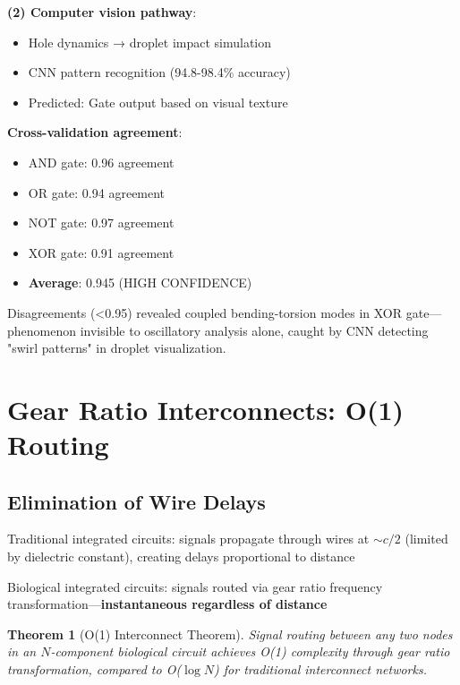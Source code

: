 \documentclass[11pt,a4paper]{article}
\newtheorem{theorem}{Theorem}[section]
\begin{document}
\textbf{(2) Computer vision pathway}:
\begin{itemize}
\item Hole dynamics → droplet impact simulation
\item CNN pattern recognition (94.8-98.4\% accuracy)
\item Predicted: Gate output based on visual texture
\end{itemize}

\textbf{Cross-validation agreement}:
\begin{itemize}
\item AND gate: 0.96 agreement
\item OR gate: 0.94 agreement
\item NOT gate: 0.97 agreement
\item XOR gate: 0.91 agreement
\item \textbf{Average}: 0.945 (HIGH CONFIDENCE)
\end{itemize}

Disagreements (<0.95) revealed coupled bending-torsion modes in XOR gate—phenomenon invisible to oscillatory analysis alone, caught by CNN detecting "swirl patterns" in droplet visualization.

\section{Gear Ratio Interconnects: O(1) Routing}

\subsection{Elimination of Wire Delays}

Traditional integrated circuits: signals propagate through wires at $\sim c/2$ (limited by dielectric constant), creating delays proportional to distance

Biological integrated circuits: signals routed via gear ratio frequency transformation—\textbf{instantaneous regardless of distance}

\begin{theorem}[O(1) Interconnect Theorem]
Signal routing between any two nodes in an $N$-component biological circuit achieves O(1) complexity through gear ratio transformation, compared to O($\log N$) for traditional interconnect networks.
\end{theorem}
\end{document}
